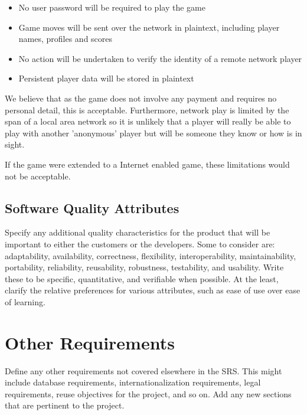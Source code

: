 \documentclass[a4paper,10pt]{article}
\begin{document}
\begin{itemize}
\item No user password will be required to play the game
\item Game moves will be sent over the network in plaintext, including player names, profiles and scores
\item No action will be undertaken to verify the identity of a remote network player
\item Persistent player data will be stored in plaintext
\end{itemize}

We believe that as the game does not involve any payment and requires no personal detail, this is acceptable. Furthermore, network play is limited by the span of a local area network so it is unlikely that a player will really be able to play with another 'anonymous' player but will be someone they know or how is in sight.

If the game were extended to a Internet enabled game, these limitations would not be acceptable. 

\subsection{Software Quality Attributes}

Specify any additional quality characteristics for the product that will be important to either the customers or the developers. Some to consider are: adaptability, availability, correctness, flexibility, interoperability, maintainability, portability, reliability, reusability, robustness, testability, and usability. Write these to be specific, quantitative, and verifiable when possible. At the least, clarify the relative preferences for various attributes, such as ease of use over ease of learning.





\section{Other Requirements}
Define any other requirements not covered elsewhere in the SRS. This might include database requirements, internationalization requirements, legal requirements, reuse objectives for the project, and so on. Add any new sections that are pertinent to the project.
\end{document}
